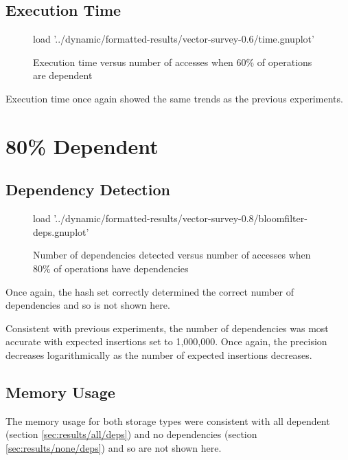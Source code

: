 	\subsection{Execution Time} \label{sec:results/60/time}
	\begin{figure}
		\centering
		\begin{gnuplot}[terminal=pdf]
			load '../dynamic/formatted-results/vector-survey-0.6/time.gnuplot'
		\end{gnuplot}
		\caption{Execution time versus number of accesses when 60\% of operations are dependent}
		\label{chart:60-time}
	\end{figure}
	
	Execution time once again showed the same trends as the previous experiments.
	
\section{80\% Dependent} \label{sec:results/80}
\subsection{Dependency Detection} \label{sec:results/80/deps}
	\begin{figure}
		\centering
		\begin{gnuplot}[terminal=pdf]
			load '../dynamic/formatted-results/vector-survey-0.8/bloomfilter-deps.gnuplot'
		\end{gnuplot}
		\caption{Number of dependencies detected versus number of accesses when 80\% of operations have dependencies}
		\label{chart:80-dep}
	\end{figure}
	
	Once again, the hash set correctly determined the correct number of dependencies and so is not shown here.
		
	Consistent with previous experiments, the number of dependencies was most accurate with expected insertions set to 1,000,000. Once again, the precision decreases logarithmically as the number of expected insertions decreases.
	
	\subsection{Memory Usage} \label{sec:results/80/mem}
	The memory usage for both storage types were consistent with all dependent (section \ref{sec:results/all/deps}) and no dependencies (section \ref{sec:results/none/deps}) and so are not shown here.
	
